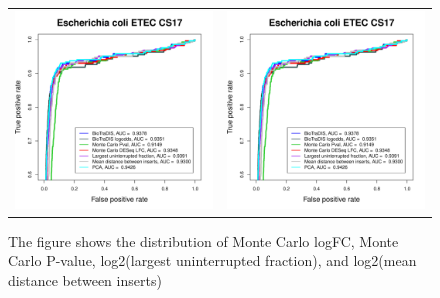 \documentclass[12pt,letterpaper]{article}
\begin{document}
\begin{figure}
\begin{tabular}{c c}
\includegraphics[page=6, scale=0.5]{essential-call-comparison-CS17.pdf} &
\includegraphics[page=7, scale=0.5]{essential-call-comparison-CS17.pdf} \\
\end{tabular}
\caption{The figure shows the distribution of Monte Carlo logFC, Monte Carlo P-value, log2(largest uninterrupted fraction), and log2(mean distance between inserts)}
\label{fig:hist}
\end{figure}
\end{document}
